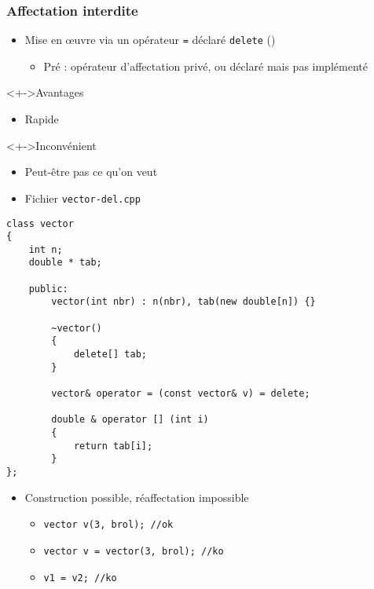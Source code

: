 \begin{frame}
\frametitle{Affectation interdite}
\begin{itemize}[<+->]
\item Mise en œuvre via un opérateur \texttt{=} déclaré \lstinline|delete| ()
	\begin{itemize}
	\item Pré  : opérateur d'affectation privé, ou déclaré mais pas implémenté
	\end{itemize}
\end{itemize}
\begin{exampleblock}<+->{Avantages}
	\begin{itemize}[<+->]
	\item Rapide
	\end{itemize}
\end{exampleblock}
\begin{alertblock}<+->{Inconvénient}
	\begin{itemize}[<+->]
	\item Peut-être pas ce qu'on veut
	\end{itemize}
\end{alertblock}
\end{frame}

\begin{frame}[containsverbatim]
\begin{itemize}
\item Fichier \texttt{vector-del.cpp}
\end{itemize}
\begin{lstlisting}
class vector
{
	int n;
	double * tab;
	
	public:
		vector(int nbr) : n(nbr), tab(new double[n]) {}				
		
		~vector()
		{
			delete[] tab;
		}
		
		vector& operator = (const vector& v) = delete;			

		double & operator [] (int i)
		{
			return tab[i];
		}		
};
\end{lstlisting}
\begin{itemize}
\item Construction possible, réaffectation impossible
	\begin{itemize}
	\item \lstinline|vector v(3, brol); //ok|
	\item \lstinline|vector v = vector(3, brol); //ko|
	\item \lstinline|v1 = v2; //ko|
	\end{itemize}
\end{itemize}
\end{frame}

